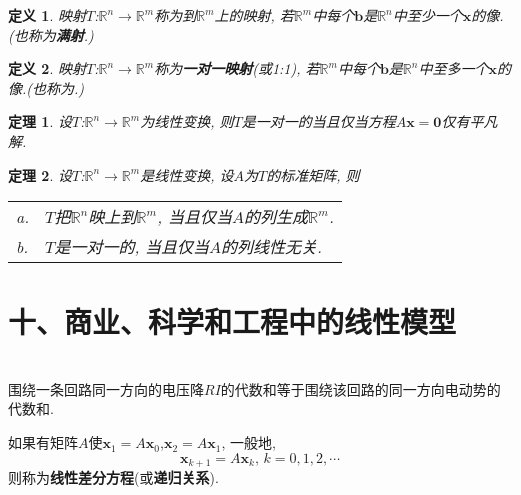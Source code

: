 \documentclass[UTF8,fontset=ubuntu]{ctexart}
\theoremstyle{plain}
\newtheorem{theorem}{定理}
\theoremstyle{nonumberplain}
\newtheorem{definition}{定义}
\theoremstyle{empty}
\begin{document}
\begin{definition}
映射$T$:$\mathbb{R}^n\rightarrow\mathbb{R}^m$称为到$\mathbb{R}^m$上的映射, 若$\mathbb{R}^m$中每个$\bm{b}$是$\mathbb{R}^n$中至少一个$\bm{x}$的像.(也称为\textbf{满射}.)
\end{definition}\vspace{4ex}

\begin{definition}
映射$T$:$\mathbb{R}^n\rightarrow\mathbb{R}^m$称为\textbf{一对一映射}(或1:1), 若$\mathbb{R}^m$中每个$\bm{b}$是$\mathbb{R}^n$中至多一个$\bm{x}$的像.(也称为.)
\end{definition}\vspace{4ex}

\begin{theorem}
设$T$:$\mathbb{R}^n\rightarrow\mathbb{R}^m$为线性变换, 则$T$是一对一的当且仅当方程$A\bm{x}=\bm{0}$仅有平凡解.
\end{theorem}\vspace{4ex}

\begin{theorem}
设$T$:$\mathbb{R}^n\rightarrow\mathbb{R}^m$是线性变换, 设$A$为$T$的标准矩阵, 则\\
\begin{tabular}{l@{\ }l}
a. & $T$把$\mathbb{R}^n$映上到$\mathbb{R}^m$, 当且仅当$A$的列生成$\mathbb{R}^m$.\\
b. & $T$是一对一的, 当且仅当$A$的列线性无关.
\end{tabular}
\end{theorem}\vspace{6ex}

\section{十、商业、科学和工程中的线性模型}
\begin{law}[基尔霍夫电压定律]\ \\
围绕一条回路同一方向的电压降$RI$的代数和等于围绕该回路的同一方向电动势的代数和.
\end{law}\vspace{4ex}

\begin{law}
如果有矩阵$A$使$\bm{x}_1=A\bm{x}_0$,$\bm{x}_2=A\bm{x}_1$, 一般地,
\[\bm{x}_{k+1}=A\bm{x}_k\text{,\ }k=0,1,2,\cdots\]
则称为\textbf{线性差分方程}(或\textbf{递归关系}).
\end{law}


\end{document}
